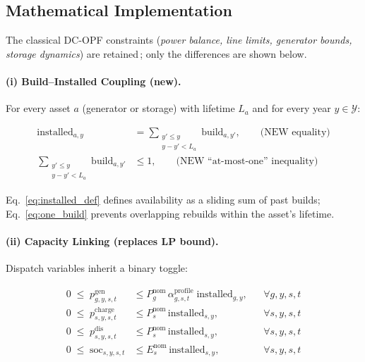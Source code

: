 \subsection{Mathematical Implementation}
\label{ssec:MILP_implementation}

The classical DC-OPF constraints (\emph{power balance, line limits, generator bounds, 
storage dynamics}) are retained\,\cite{wood2013power}; only the differences are shown 
below.

\paragraph{(i) Build–Installed Coupling (new).}
For every asset $a$ (generator or storage) with lifetime $L_a$ and for every year 
$y\in\mathcal{Y}$:

\begin{subequations}
\label{eq:build_install}
\begin{align}
\text{installed}_{a,y} &= 
      \sum_{\substack{y'\le y\\ y-y'<L_a}}
      \text{build}_{a,y'} ,
      \qquad\text{(NEW equality)} \label{eq:installed_def}\\[2pt]
\sum_{\substack{y'\le y\\ y-y'<L_a}}
      \text{build}_{a,y'} &\le 1 ,
      \qquad\text{(NEW ``at-most-one'' inequality)} \label{eq:one_build}
\end{align}
\end{subequations}

Eq.~\eqref{eq:installed_def} defines availability as a sliding sum of past builds;  
Eq.~\eqref{eq:one_build} prevents overlapping rebuilds within the asset’s lifetime.

\paragraph{(ii) Capacity Linking (replaces LP bound).}
Dispatch variables inherit a binary toggle:

\begin{align}
0\;\le\;p^{\text{gen}}_{g,y,s,t}
      &\le
      P^{\text{nom}}_{g}\,
      \alpha^{\text{profile}}_{g,s,t}\;
      \text{installed}_{g,y},
      &&\forall g,y,s,t \label{eq:gen_cap}\\
0\;\le\;p^{\text{charge}}_{s,y,s,t}
      &\le
      P^{\text{nom}}_{s}\,
      \text{installed}_{s,y},            &&\forall s,y,s,t \nonumber\\
0\;\le\;p^{\text{dis}}_{s,y,s,t}
      &\le
      P^{\text{nom}}_{s}\,
      \text{installed}_{s,y},            &&\forall s,y,s,t \nonumber\\
0\;\le\;\text{soc}_{s,y,s,t}
      &\le
      E^{\text{nom}}_{s}\,
      \text{installed}_{s,y},            &&\forall s,y,s,t \label{eq:soc_cap}
\end{align}


